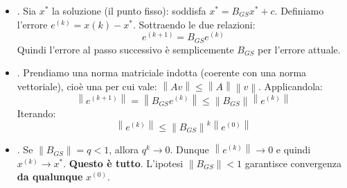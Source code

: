 \begin{itemize}
\begin{deepeningbox}
\begin{itemize}
            \item {}. Sia $x^{*}$ la soluzione (il punto fisso): soddisfa $x^{*} = B_{GS}x^{*} + c$. Definiamo l'errore $e^{(k)} = x(k) - x^{*}$. Sottraendo le due relazioni:
            \begin{equation*}
                e^{(k+1)} = B_{GS} e^{(k)}
            \end{equation*}
            Quindi l'errore al passo successivo è semplicemente $B_{GS}$ per l'errore attuale.


            \item {}. Prendiamo una norma matriciale indotta (coerente con una norma vettoriale), cioè una per cui vale: $\left\| A v \right\| \le \left\| A \right\| \left\| v \right\|$. Applicandola:
            \begin{equation*}
                \left\| e^{(k+1)} \right\| = \left\| B_{GS}e^{(k)} \right\| \le \left\| B_{GS} \right\| \left\| e^{(k)} \right\|
            \end{equation*}
            Iterando:
            \begin{equation*}
                \left\| e^{(k)} \right\| \le \left\| B_{GS} \right\|^{k} \left\| e^{(0)} \right\|
            \end{equation*}

            
            \item {}. Se $\left\| B_{GS} \right\| = q < 1$, allora $q^{k} \to 0$. Dunque $\left\| e^{(k)} \right\| \to 0$ e quindi $x^{(k)} \to x^{*}$. \textbf{Questo è tutto}. L'ipotesi $\left\|B_{GS}\right\| < 1$ garantisce convergenza \textbf{da qualunque} $x^{(0)}$.
        \end{itemize}
    \end{deepeningbox}
\end{itemize}